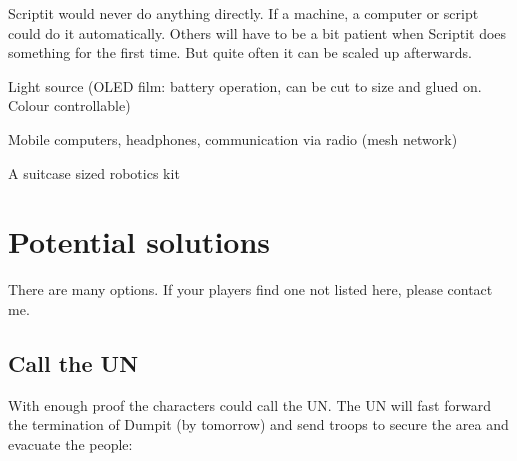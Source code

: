 \begin{npcBox}[title=Scriptit - a Pioneer Automationationeer]
    \begin{stressSection}
    \end{stressSection}
    \begin{tabularx}{\textwidth}{ XX }
    \end{tabularx}
    
    \begin{consequences}
    \item {}
    \item {}
    \item {}
    \end{consequences}
    
    \begin{npcDescription}
    Scriptit would never do anything directly. If a machine, a computer or script could do it automatically. Others will have to be a bit patient when Scriptit does something for the first time. But quite often it can be scaled up afterwards.

    \end{npcDescription}
    
    \begin{equipment}
        \item Light source (OLED film: battery operation, can be cut to size and glued on. Colour controllable)
        \item Mobile computers, headphones, communication via radio (mesh network)
        \item A suitcase sized robotics kit
    \end{equipment}
\end{npcBox}

\section{Potential solutions}

There are many options. If your players find one not listed here, please contact me.

\subsection{Call the UN}

With enough proof the characters could call the UN. The UN will fast forward the termination of Dumpit (by tomorrow) and send troops to secure the area and evacuate the people:

